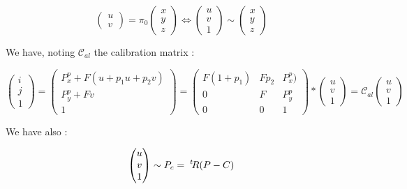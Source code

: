 \begin{equation}
	 \begin{pmatrix} u \\ v \end{pmatrix}  = \pi_0  \begin{pmatrix} x \\ y \\z  \end{pmatrix}
   \Leftrightarrow   \begin{pmatrix} u \\ v \\ 1 \end{pmatrix}  \sim  \begin{pmatrix} x \\ y \\z  \end{pmatrix}
\end{equation}

We have, noting $\mathcal{C}_{al}$ the calibration matrix :

\begin{equation}
	   \begin{pmatrix} i \\ j \\ 1\end{pmatrix}
      =   \begin{pmatrix} P^p_x + F(u+p_1u+p_2v) \\ P^p_y + F v \\ 1\end{pmatrix}
      =  \begin{pmatrix} F(1+p_1) & F p_2 & P^p_x ) \\  0 &   F & P^p_y \\  0 & 0 &1\end{pmatrix} * \begin{pmatrix} u \\  v \\ 1\end{pmatrix} 
	      =  \mathcal{C}_{al} \begin{pmatrix} u \\  v \\ 1\end{pmatrix} 
              \label{UCResecCalibM}
\end{equation}

We have also :

\begin{equation}
	 \begin{pmatrix} u \\  v \\ 1\end{pmatrix}
		 \sim P_c =  \; ^{t} \! R(P-C)
\end{equation}

